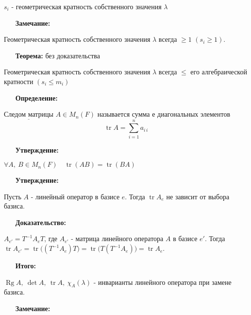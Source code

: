 \documentclass[12pt, letterpaper, twoside]{article}
\newcommand{\Underl}[1]{$\underline{\text{#1}}$}
\newcommand{\DS}{\displaystyle}
\newcommand{\tr}{\operatorname{tr}}
\newcommand{\Rg}{\operatorname{Rg}}
\begin{document}
         $s_i$ - геометрическая кратность собственного значения $\lambda$
         \begin{enumerate}
            \item[\textbf{Замечание:}]
         \end{enumerate}
         Геометрическая кратность собственного значения $\lambda$ всегда $\geq 1$ $(s_i \geq 1)$.
         \begin{enumerate}
            \item[\textbf{Теорема:}] без доказательства
         \end{enumerate}
         Геометрическая кратность собственного значения $\lambda$ всегда $\leq$ его алгебраической кратности $(s_i \leq m_i)$
         \begin{enumerate}
            \item[\textbf{Определение:}]
         \end{enumerate}
         \Underl{Следом матрицы} $A\in M_n(F)$ называется сумма е диагональных элементов
         \[\operatorname{tr}A = \DS \sum_{i = 1}^{n}a_{i\, i}\]
         \begin{enumerate}
            \item[\textbf{Утверждение:}]
         \end{enumerate}
         $\forall A,\ B\in M_n(F)\quad \tr(AB) = \tr(BA)$
         \begin{enumerate}
            \item[\textbf{Утверждение:}]
         \end{enumerate}
         Пусть $A$ - линейный оператор в базисе $e$. Тогда $\tr A_e$ не зависит от выбора базиса.
         \begin{enumerate}
            \item[\textbf{Доказательство:}]
         \end{enumerate}
         $A_{e'} = T^{-1}A_e T$, где $A_{e'}$ - матрица линейного оператора $A$ в базисе $e'$. Тогда $\tr A_{e'} =\tr\big((T^{-1}A_e)T\big) = \tr\big(T(T^{-1}A_e)\big) = \tr A_e$.\newpage
         \begin{enumerate}
            \item[\textbf{Итого:}]
         \end{enumerate}
         $\Rg A,\ \det A,\ \tr A,\ \chi_A(\lambda)$ - инварианты линейного оператора при замене базиса.
         \begin{enumerate}
            \item[\textbf{Замечание:}]
         \end{enumerate}
\end{document}
